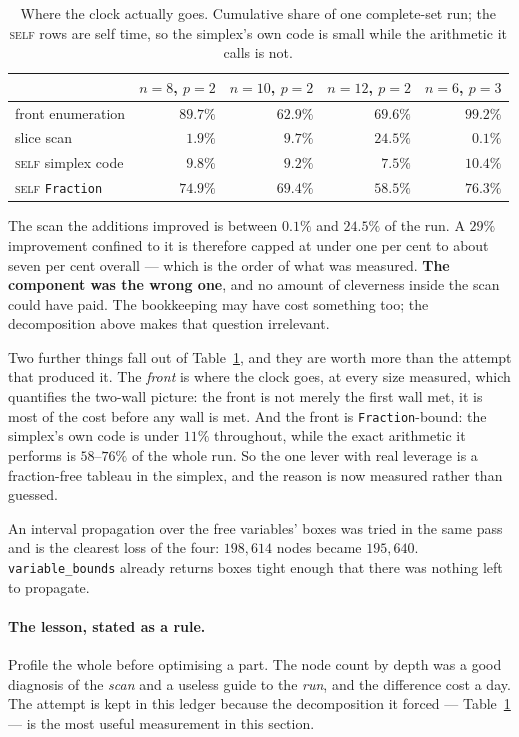 \documentclass[11pt,a4paper]{article}
\begin{document}
\begin{table}[h]
\centering
\caption{Where the clock actually goes.  Cumulative share of one complete-set
run; the \textsc{self} rows are self time, so the simplex's own code is small
while the arithmetic it calls is not.}
\label{tab:split}
\begin{tabular}{lrrrr}
\toprule
 & $n{=}8$, $p{=}2$ & $n{=}10$, $p{=}2$ & $n{=}12$, $p{=}2$ & $n{=}6$, $p{=}3$ \\
\midrule
front enumeration        & $\mathbf{89.7\%}$ & $\mathbf{62.9\%}$ & $\mathbf{69.6\%}$ & $\mathbf{99.2\%}$ \\
slice scan               & $1.9\%$  & $9.7\%$  & $24.5\%$ & $0.1\%$ \\
\midrule
\textsc{self} simplex code & $9.8\%$ & $9.2\%$ & $7.5\%$ & $10.4\%$ \\
\textsc{self} \texttt{Fraction} & $74.9\%$ & $69.4\%$ & $58.5\%$ & $76.3\%$ \\
\bottomrule
\end{tabular}
\end{table}

\noindent
The scan the additions improved is between $0.1\%$ and $24.5\%$ of the run.
A $29\%$ improvement confined to it is therefore capped at under one per cent
to about seven per cent overall --- which is the order of what was measured.
\textbf{The component was the wrong one}, and no amount of cleverness inside
the scan could have paid.  The bookkeeping may have cost something too; the
decomposition above makes that question irrelevant.

Two further things fall out of Table~\ref{tab:split}, and they are worth more
than the attempt that produced it.  The \emph{front} is where the clock goes,
at every size measured, which quantifies the two-wall picture: the front is not merely the first wall met, it is
most of the cost before any wall is met.  And the front is
\texttt{Fraction}-bound: the simplex's own code is under $11\%$ throughout,
while the exact arithmetic it performs is $58$--$76\%$ of the whole run.  So
the one lever with real leverage is a fraction-free tableau in the simplex, and
the reason is now measured rather than guessed.

An interval propagation over the free variables' boxes was tried in the same
pass and is the clearest loss of the four: $198{,}614$ nodes became
$195{,}640$.  \texttt{variable\_bounds} already returns boxes tight enough
that there was nothing left to propagate.

\paragraph{The lesson, stated as a rule.}  Profile the whole before
optimising a part.  The node count by depth was a good diagnosis of the
\emph{scan} and a useless guide to the \emph{run}, and the difference cost a
day.  The attempt is kept in this ledger because the decomposition it forced
--- Table~\ref{tab:split} --- is the most useful measurement in this section.
\end{document}
